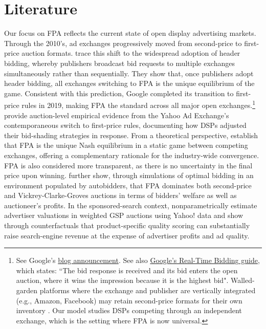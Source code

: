 \documentclass[11pt]{article}
\theoremstyle{plain}
\theoremstyle{definition}
\theoremstyle{plain}
\theoremstyle{plain}
\theoremstyle{plain}
\theoremstyle{plain}
\numberwithin{equation}{section}
\begin{document}
\section{Literature}\label{sect:lit}
\noindent Our focus on FPA reflects the current state of open display advertising markets. Through the 2010's, ad exchanges progressively moved from second-price to first-price auction formats. \textcite{despotakisFirstPriceAuctionsOnline2021} trace this shift to the widespread adoption of header bidding, whereby publishers broadcast bid requests to multiple exchanges simultaneously rather than sequentially. They show that, once publishers adopt header bidding, all exchanges switching to FPA is the unique equilibrium of the game. Consistent with this prediction, Google completed its transition to first-price rules in 2019, making FPA the standard across all major open exchanges.\footnote{See Google's \href{https://blog.google/products/admanager/update-first-price-auctions-google-ad-manager/}{blog announcement}. See also \href{https://developers.google.com/authorized-buyers/rtb/start}{Google's Real-Time Bidding guide}, which states: ``The bid response is received and its bid enters the open auction, where it wins the impression because it is the highest bid". Walled-garden platforms where the exchange and publisher are vertically integrated (e.g., Amazon, Facebook) may retain second-price formats for their own inventory \parencite{choiOptimizingReservePrices2023}. Our model studies DSPs competing through an independent exchange, which is the setting where FPA is now universal.} \textcite{alcobendasSlimShadingAd2021} provide auction-level empirical evidence from the Yahoo Ad Exchange's contemporaneous switch to first-price rules, documenting how DSPs adjusted their bid-shading strategies in response. From a theoretical perspective, \textcite{lemeWhyCompetitiveMarkets2020} establish that FPA is the unique Nash equilibrium in a static game between competing exchanges, offering a complementary rationale for the industry-wide convergence. FPA is also considered more transparent, as there is no uncertainty in the final price upon winning. \textcite{dengNonuniformBidscalingEquilibria2024} further show, through simulations of optimal bidding in an environment populated by autobidders, that FPA dominates both second-price and Vickrey-Clarke-Groves auctions in terms of bidders' welfare as well as auctioneer's profits. In the sponsored-search context, \textcite{kimNonparametricEstimationSponsored2025} nonparametrically estimate advertiser valuations in weighted GSP auctions using Yahoo! data and show through counterfactuals that product-specific quality scoring can substantially raise search-engine revenue at the expense of advertiser profits and ad quality.\par 
\end{document}
